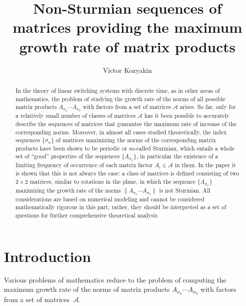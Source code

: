 \documentclass[a4paper,10pt,reqno]{amsart}
\title[Non-Sturmian sequences of matrices]{Non-Sturmian sequences of matrices
providing the maximum growth rate of matrix products}
\author{Victor Kozyakin}
\date{}
\newcommand{\setA}{\mathscr{A}}
\begin{document}
\begin{abstract}
In the theory of linear switching systems with discrete time, as in other
areas of mathematics, the problem of studying the growth rate of the norms of
all possible matrix products $A_{\sigma_{n}}\cdots A_{\sigma_{0}}$ with
factors from a set of matrices $\mathscr{A}$ arises. So far, only for a
relatively small number of classes of matrices $\mathscr{A}$ has it been possible
to accurately describe the sequences of matrices that guarantee the maximum
rate of increase of the corresponding norms. Moreover, in almost all cases
studied theoretically, the index sequences $\{\sigma_{n}\}$ of matrices
maximizing the norms of the corresponding matrix products have been shown
to be periodic or so-called Sturmian, which entails a whole set of ``good''
properties of the sequences $\{A_{\sigma_{n}}\}$, in particular the
existence of a limiting frequency of occurrence of each matrix factor
$A_{i}\in\mathscr{A}$ in them. In the paper it is shown that this is not
always the case: a class of matrices is defined consisting of two $2\times 2$
matrices, similar to rotations in the plane, in which the sequence
$\{A_{\sigma_{n}}\}$ maximizing the growth rate of the norms
$\|A_{\sigma_{n}}\cdots A_{\sigma_{0}}\|$ is not Sturmian. All
considerations are based on numerical modeling and cannot be considered
mathematically rigorous in this part; rather, they should be interpreted as
a set of questions for further comprehensive theoretical analysis.
\end{abstract}

\maketitle

\section{Introduction}\label{S:intro}

Various problems of mathematics reduce to the problem of computing the
maximum growth rate of the norms of matrix products $A_{\sigma_{n}}\cdots
A_{\sigma_{0}}$ with factors from a set of matrices~$\setA$.
\end{document}
